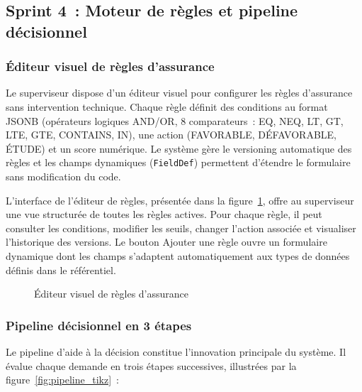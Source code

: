 \subsection{Sprint 4~: Moteur de r\`{e}gles et pipeline d\'{e}cisionnel}

\subsubsection{\'{E}diteur visuel de r\`{e}gles d'assurance}

Le superviseur dispose d'un \'{e}diteur visuel pour configurer les r\`{e}gles d'assurance sans intervention technique. Chaque r\`{e}gle d\'{e}finit des conditions au format JSONB (op\'{e}rateurs logiques AND/OR, 8 comparateurs~: EQ, NEQ, LT, GT, LTE, GTE, CONTAINS, IN), une action (FAVORABLE, D\'{E}FAVORABLE, \'{E}TUDE) et un score num\'{e}rique. Le syst\`{e}me g\`{e}re le versioning automatique des r\`{e}gles et les champs dynamiques (\texttt{FieldDef}) permettent d'\'{e}tendre le formulaire sans modification du code.

L'interface de l'\'{e}diteur de r\`{e}gles, pr\'{e}sent\'{e}e dans la figure~\ref{fig:rules}, offre au superviseur une vue structur\'{e}e de toutes les r\`{e}gles actives. Pour chaque r\`{e}gle, il peut consulter les conditions, modifier les seuils, changer l'action associ\'{e}e et visualiser l'historique des versions. Le bouton \og Ajouter une r\`{e}gle \fg ouvre un formulaire dynamique dont les champs s'adaptent automatiquement aux types de donn\'{e}es d\'{e}finis dans le r\'{e}f\'{e}rentiel.

\begin{figure}[H]
    \centering
    \caption{\'{E}diteur visuel de r\`{e}gles d'assurance}
    \label{fig:rules}
\end{figure}

\subsubsection{Pipeline d\'{e}cisionnel en 3 \'{e}tapes}

Le pipeline d'aide \`{a} la d\'{e}cision constitue l'innovation principale du syst\`{e}me. Il \'{e}value chaque demande en trois \'{e}tapes successives, illustr\'{e}es par la figure~\ref{fig:pipeline_tikz}~:

